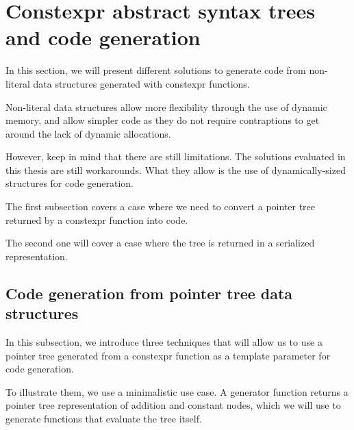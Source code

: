 \documentclass[../main]{subfiles}
\begin{document}
\section{
  Constexpr abstract syntax trees and code generation
}

In this section, we will present different solutions to generate code
from non-literal data structures generated with \gls{constexpr} functions.

Non-literal data structures allow more flexibility through the use of
dynamic memory, and allow simpler code as they do not require contraptions
to get around the lack of dynamic allocations.


However, keep in mind that there are still limitations.
The solutions evaluated in this thesis are still workarounds.
What they allow is the use of dynamically-sized structures for code generation.

The first subsection covers a case where we need to convert a
pointer tree returned by a \gls{constexpr} function into code.

The second one will cover a case where the tree is returned in a serialized
representation.

\subsection{
  Code generation from pointer tree data structures
}

\label{lbl:ptr-tree-codegen}

In this subsection, we introduce three techniques that will allow us to use
a pointer tree generated from a \gls{constexpr} function as a template parameter
for code generation.

To illustrate them, we use a minimalistic use case.
A generator function returns a pointer tree representation of addition and
constant nodes, which we will use to generate functions that evaluate
the tree itself.
\end{document}
